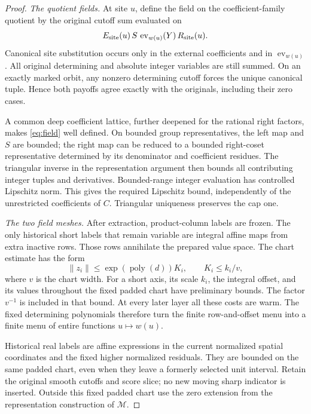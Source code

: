 \documentclass[11pt,a4paper]{article}
\theoremstyle{definition}
\newcommand{\M}{\mathcal M}
\newcommand{\ev}{\operatorname{ev}}
\newcommand{\poly}{\operatorname{poly}}
\begin{document}
\begin{proof}
\textit{The quotient fields.}
At site \(u\), define the field on the coefficient-family quotient by
the original cutoff sum evaluated on
\begin{equation}\label{eq:field}
 E_{\rm site}(u)\,S\,
       \ev_{w(u)}(Y)\,R_{\rm site}(u).
\end{equation}
Canonical site substitution occurs only in the external coefficients
and in \(\ev_{w(u)}\). All original determining and absolute integer
variables are still summed. On an exactly marked orbit, any nonzero
determining cutoff forces the unique canonical tuple. Hence both
payoffs agree exactly with the originals, including their zero
cases.

A common deep coefficient lattice, further deepened for the rational
right factors, makes \eqref{eq:field} well defined. On bounded group
representatives, the left map and \(S\) are bounded; the right map
can be reduced to a bounded right-coset representative determined by
its denominator and coefficient residues. The triangular inverse
in the representation argument then bounds all contributing integer
tuples and derivatives. Bounded-range integer evaluation has
controlled Lipschitz norm. This gives the required Lipschitz bound,
independently of the unrestricted coefficients of \(C\).
Triangular uniqueness preserves the cap one.

\textit{The two field meshes.}
After extraction, product-column labels are frozen. The only
historical short labels that remain variable are integral affine
maps from extra inactive rows. Those rows annihilate the prepared
value space. The chart estimate has the form
\[
 \|z_i\|\le \exp(\poly(d))K_i,\qquad K_i\le k_i/v,
\]
where \(v\) is the chart width. For a short axis, its scale \(k_i\),
the integral offset, and its values throughout the fixed padded
chart have preliminary bounds. The factor \(v^{-1}\) is included
in that bound. At every later layer all these costs are warm.
The fixed determining polynomials therefore turn the finite
row-and-offset menu into a finite menu of entire functions
\(u\mapsto w(u)\).

Historical real labels are affine expressions in the current
normalized spatial coordinates and the fixed higher normalized
residuals. They are bounded on the same padded chart, even when
they leave a formerly selected unit interval. Retain the original
smooth cutoffs and score slice; no new moving sharp indicator is
inserted. Outside this fixed padded chart use the zero extension
from the representation construction of \(\M\).


\end{proof}
\end{document}
